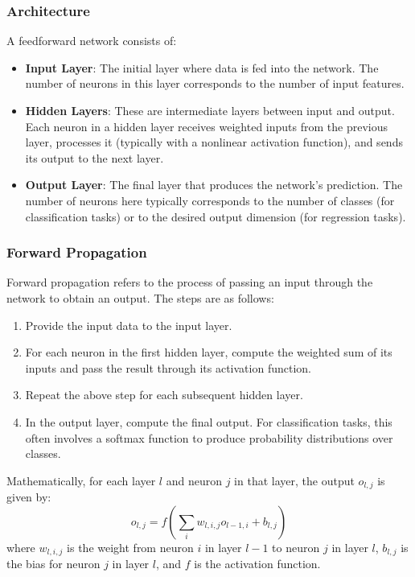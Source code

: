 \subsubsection{Architecture}

A feedforward network consists of:
\begin{itemize}
    \item \textbf{Input Layer}: The initial layer where data is fed into the network. The number of neurons in this layer corresponds to the number of input features.
    \item \textbf{Hidden Layers}: These are intermediate layers between input and output. Each neuron in a hidden layer receives weighted inputs from the previous layer, processes it (typically with a nonlinear activation function), and sends its output to the next layer.
    \item \textbf{Output Layer}: The final layer that produces the network's prediction. The number of neurons here typically corresponds to the number of classes (for classification tasks) or to the desired output dimension (for regression tasks).
\end{itemize}

\subsubsection{Forward Propagation}

Forward propagation refers to the process of passing an input through the network to obtain an output. The steps are as follows:
\begin{enumerate}
    \item Provide the input data to the input layer.
    \item For each neuron in the first hidden layer, compute the weighted sum of its inputs and pass the result through its activation function.
    \item Repeat the above step for each subsequent hidden layer.
    \item In the output layer, compute the final output. For classification tasks, this often involves a softmax function to produce probability distributions over classes.
\end{enumerate}

Mathematically, for each layer \( l \) and neuron \( j \) in that layer, the output \( o_{l,j} \) is given by:
\[ o_{l,j} = f\left( \sum_{i} w_{l,i,j} o_{l-1,i} + b_{l,j} \right) \]
where \( w_{l,i,j} \) is the weight from neuron \( i \) in layer \( l-1 \) to neuron \( j \) in layer \( l \), \( b_{l,j} \) is the bias for neuron \( j \) in layer \( l \), and \( f \) is the activation function.

